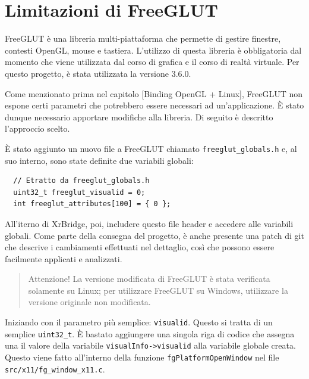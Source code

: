 \documentclass[twoside]{supsistudent}
\begin{document}

\section{Limitazioni di FreeGLUT}

FreeGLUT è una libreria multi-piattaforma che permette di gestire finestre, contesti OpenGL, mouse e tastiera. L'utilizzo di questa libreria è obbligatoria dal momento che viene utilizzata dal corso di grafica e il corso di realtà virtuale. Per questo progetto, è stata utilizzata la versione 3.6.0.


Come menzionato prima nel capitolo [Binding OpenGL + Linux], FreeGLUT non espone certi parametri che potrebbero essere necessari ad un'applicazione. È stato dunque necessario apportare modifiche alla libreria. Di seguito è descritto l'approccio scelto.

È stato aggiunto un nuovo file a FreeGLUT chiamato \texttt{freeglut\_globals.h} e, al suo interno, sono state definite due variabili globali:

\begin{verbatim}
  // Etratto da freeglut_globals.h
  uint32_t freeglut_visualid = 0;
  int freeglut_attributes[100] = { 0 };
\end{verbatim}

All'iterno di XrBridge, poi, includere questo file header e accedere alle variabili globali. Come parte della consegna del progetto, è anche presente una patch di git che descrive i cambiamenti effettuati nel dettaglio, così che possono essere facilmente applicati e analizzati.

\begin{quote}
  Attenzione! La versione modificata di FreeGLUT è stata verificata solamente su Linux; per utilizzare FreeGLUT su Windows, utilizzare la versione originale non modificata.
\end{quote}

Iniziando con il parametro più semplice: \texttt{visualid}. Questo si tratta di un semplice \texttt{uint32\_t}. È bastato aggiungere una singola riga di codice che assegna una il valore della variabile \texttt{visualInfo->visualid} alla variabile globale creata. Questo viene fatto all'interno della funzione \texttt{fgPlatformOpenWindow} nel file \texttt{src/x11/fg\_window\_x11.c}.
\end{document}
